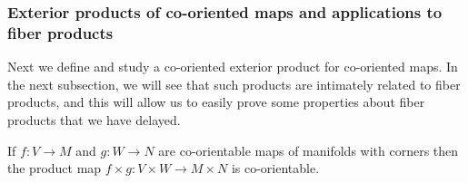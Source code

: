 \subsubsection{Exterior products of co-oriented maps and applications to fiber products}

Next we define and study a co-oriented exterior product for co-oriented maps.
In the next subsection, we will see that such products are intimately related to fiber products, and this will allow us to easily prove some properties about fiber products that we have delayed.

\begin{comment}
Before getting to co-orientations, we first show that a product of proper maps is proper.

\begin{lemma}\label{L: proper product}
	If $f \colon V \to M$ and $g \colon W \to N$ are proper maps of spaces then the product map $f \times g \colon V \times W \to M \times N$ is proper.
\end{lemma}

\begin{proof}
	Let $\pi_M,\pi_N$ be the projections of $M \times N$ to $M$ and $N$, and similarly for $\pi_V, \pi_W$.
	Let $K$ be a compact subspace of $M \times N$.
	Then $\pi_M(K)$ and $\pi_N(K)$ are compact, and hence so is $\pi_M(K) \times \pi_N(K) \subset M \times N$, and this set contains $K$.
	So
	$$(f \times g)^{-1}(K) \subset (f \times g)^{-1}(\pi_M(K) \times \pi_N(K)) = f^{-1}(\pi_M(K)) \times g^{-1}(\pi_N(K)).$$
	But now $f^{-1}(\pi_M(K))$ and $g^{-1}(\pi_N(K))$ are compact as $f$ and $g$ are proper and so $(f \times g)^{-1}(K)$ is a closed subset of a compact set, hence compact.
\end{proof}

\end{comment}

\begin{lemma}
	If $f \colon V \to M$ and $g \colon W \to N$ are co-orientable maps of manifolds with corners then the product map $f \times g \colon V \times W \to M \times N$ is co-orientable.
\end{lemma}


